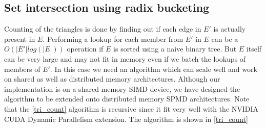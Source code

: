 \documentclass[conference]{IEEEtran}
\begin{document}






\subsection{Set intersection using radix bucketing}
Counting of the triangles is done by finding out if each edge in $E'$ is actually present in $E$. Performing a lookup for each member from $E'$ in $E$ can be a $O(|E'|log(|E|))$ operation if $E$ is sorted using a naive binary tree. But $E$ itself can be very large and may not fit in memory even if we batch the lookups of members of $E'$. In this case we need an algorithm which can scale well and work on shared as well as distributed memory architectures. Although our implementation is on a shared memory SIMD device, we have designed the algorithm to be extended onto distributed memory SPMD architectures. Note that the \ref{tri_count} algorithm is recursive since it fit very well with the NVIDIA CUDA Dynamic Parallelism extension\cite{b21}. The algorithm is shown in \ref{tri_count}
\end{document}
